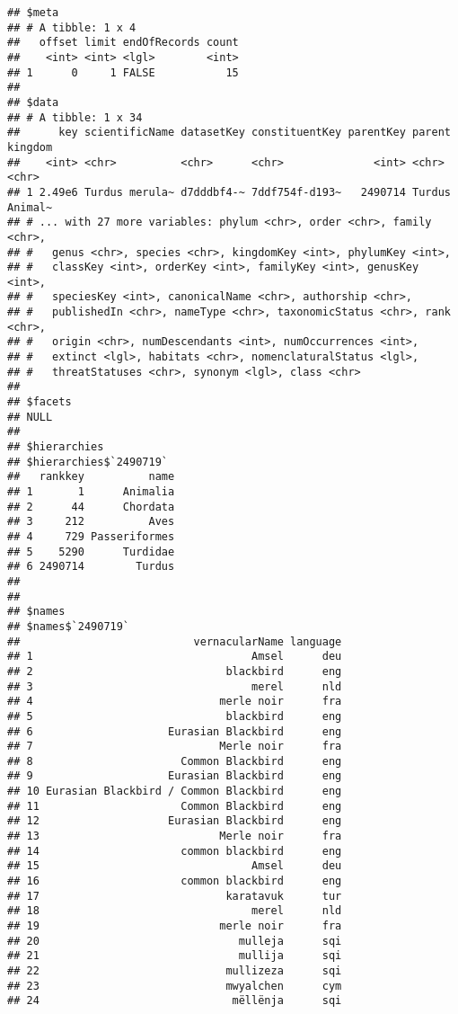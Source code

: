 \documentclass[]{article}
\begin{document}
\begin{verbatim}
## $meta
## # A tibble: 1 x 4
##   offset limit endOfRecords count
##    <int> <int> <lgl>        <int>
## 1      0     1 FALSE           15
## 
## $data
## # A tibble: 1 x 34
##      key scientificName datasetKey constituentKey parentKey parent kingdom
##    <int> <chr>          <chr>      <chr>              <int> <chr>  <chr>  
## 1 2.49e6 Turdus merula~ d7dddbf4-~ 7ddf754f-d193~   2490714 Turdus Animal~
## # ... with 27 more variables: phylum <chr>, order <chr>, family <chr>,
## #   genus <chr>, species <chr>, kingdomKey <int>, phylumKey <int>,
## #   classKey <int>, orderKey <int>, familyKey <int>, genusKey <int>,
## #   speciesKey <int>, canonicalName <chr>, authorship <chr>,
## #   publishedIn <chr>, nameType <chr>, taxonomicStatus <chr>, rank <chr>,
## #   origin <chr>, numDescendants <int>, numOccurrences <int>,
## #   extinct <lgl>, habitats <chr>, nomenclaturalStatus <lgl>,
## #   threatStatuses <chr>, synonym <lgl>, class <chr>
## 
## $facets
## NULL
## 
## $hierarchies
## $hierarchies$`2490719`
##   rankkey          name
## 1       1      Animalia
## 2      44      Chordata
## 3     212          Aves
## 4     729 Passeriformes
## 5    5290      Turdidae
## 6 2490714        Turdus
## 
## 
## $names
## $names$`2490719`
##                           vernacularName language
## 1                                  Amsel      deu
## 2                              blackbird      eng
## 3                                  merel      nld
## 4                             merle noir      fra
## 5                              blackbird      eng
## 6                     Eurasian Blackbird      eng
## 7                             Merle noir      fra
## 8                       Common Blackbird      eng
## 9                     Eurasian Blackbird      eng
## 10 Eurasian Blackbird / Common Blackbird      eng
## 11                      Common Blackbird      eng
## 12                    Eurasian Blackbird      eng
## 13                            Merle noir      fra
## 14                      common blackbird      eng
## 15                                 Amsel      deu
## 16                      common blackbird      eng
## 17                             karatavuk      tur
## 18                                 merel      nld
## 19                            merle noir      fra
## 20                               mulleja      sqi
## 21                               mullija      sqi
## 22                             mullizeza      sqi
## 23                             mwyalchen      cym
## 24                              mëllënja      sqi

\end{verbatim}
\end{document}
